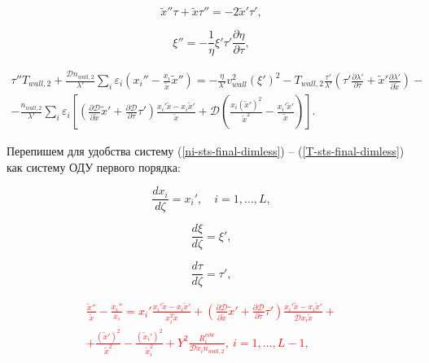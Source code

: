\documentclass[12pt]{article}
\begin{document}
\begin{equation}
  \tilde{x}''\tau + \tilde{x}\tau'' = -2\tilde{x}'\tau',
\end{equation}

\begin{equation}
  \xi'' = -\frac{1}{\eta} \xi' \tau' \frac{\partial \eta}{\partial \tau},
\end{equation}

\begin{multline}
  \tau''T_{wall,2} + \frac{\mathcal{D}n_{wall,2}}{\lambda'}\sum_{i}\varepsilon_{i}\left(x_{i}'' - \frac{x_{i}}{\tilde{x}}\tilde{x}'' \right) = -\frac{\eta}{\lambda'} v_{wall}^2 \left(\xi' \right)^2 - T_{wall,2}\frac{\tau'}{\lambda'} \left(\tau' \frac{\partial \lambda'}{\partial \tau} + \tilde{x}' \frac{\partial \lambda'}{\partial \tilde{x}} \right) - \\
  - \frac{n_{wall,2}}{\lambda'}\sum_{i}\varepsilon_{i} \left[\left(\frac{\partial \mathcal{D}}{\partial \tilde{x}}\tilde{x}' + \frac{\partial \mathcal{D}}{\partial \tau}\tau' \right) \frac{x_{i}'\tilde{x} - x_{i}\tilde{x}'}{\tilde{x}} + \mathcal{D}\left(\frac{x_{i}\left(\tilde{x}'\right)^2}{\tilde{x}^2} - \frac{x_{i}'\tilde{x}'}{\tilde{x}} \right)  \right].\label{T-sts-final-dimless}
\end{multline}

Перепишем для удобства систему (\ref{ni-sts-final-dimless}) -- (\ref{T-sts-final-dimless}) как систему ОДУ первого порядка:

\begin{equation}
  \frac{d x_{i}}{d\zeta} = x_{i}',\quad i=1,\ldots,L,\label{eqn-dx_i-sts}
\end{equation}

\begin{equation}
  \frac{d \xi}{d\zeta} = \xi', \label{eqn-dxi-sts}
\end{equation}

\begin{equation}
  \frac{d \tau}{d\zeta} = \tau', \label{eqn-dtau-sts}
\end{equation}

\textcolor{red}{
\begin{multline}
\frac{\tilde{x}''}{\tilde{x}} - \frac{x_{i}''}{x_{i}} = 
  x_{i}' \frac{x_{i}'\tilde{x} - x_{i}\tilde{x}'}{x_{i}^2 \tilde{x}} + \left(\frac{\partial \mathcal{D}}{\partial \tilde{x}}\tilde{x}' + \frac{\partial \mathcal{D}}{\partial \tau}\tau' \right) \frac{x_{i}'\tilde{x} - x_{i}\tilde{x}'}{\mathcal{D}x_{i}\tilde{x}} + \\
  + \frac{\left(\tilde{x}'\right)^2}{\tilde{x}^2} - \frac{\left(\tilde{x}_{i}'\right)^2}{\tilde{x}_{i}^2} + Y^{2}\frac{R_{i}^{vibr}}{\mathcal{D}x_{i}n_{wall,2}},\:i=1,\ldots,L-1,\label{eqn-d2x_i-sts}
\end{multline}
}
\end{document}
